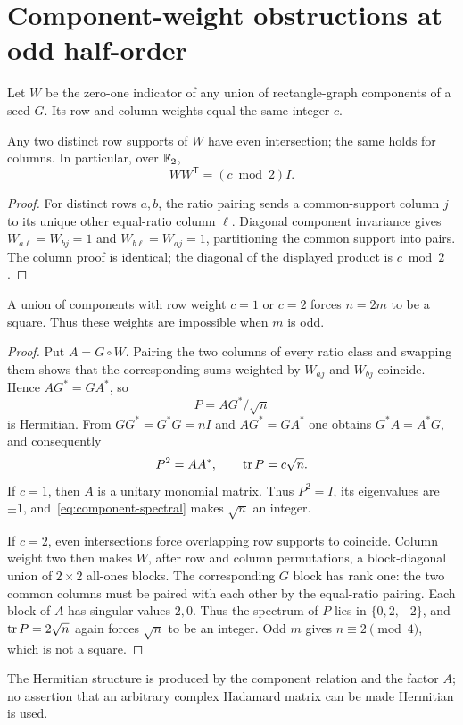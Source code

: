 \section{Component-weight obstructions at odd half-order}\label{sec:obstructions}
Let $W$ be the zero-one indicator of any union of rectangle-graph components of a seed $G$. Its row and column weights equal the same integer $c$.

\begin{lemma}\label{lem:evenintersection}
Any two distinct row supports of $W$ have even intersection; the same holds for columns. In particular, over $\mathbb F_2$,
\[
 WW^{\mathsf T}=(c\bmod2)I.
\]
\end{lemma}
\begin{proof}
For distinct rows $a,b$, the ratio pairing sends a common-support column $j$ to its unique other equal-ratio column $\ell$. Diagonal component invariance gives $W_{a\ell}=W_{bj}=1$ and $W_{b\ell}=W_{aj}=1$, partitioning the common support into pairs. The column proof is identical; the diagonal of the displayed product is $c\bmod2$.
\end{proof}

\begin{proposition}\label{prop:weightsmall}
A union of components with row weight $c=1$ or $c=2$ forces $n=2m$ to be a square. Thus these weights are impossible when $m$ is odd.
\end{proposition}
\begin{proof}
Put $A=G\circ W$. Pairing the two columns of every ratio class and swapping them shows that the corresponding sums weighted by $W_{aj}$ and $W_{bj}$ coincide. Hence $AG^*=GA^*$, so
\[
 P=AG^*/\sqrt n
\]
is Hermitian. From $GG^*=G^*G=nI$ and $AG^*=GA^*$ one obtains $G^*A=A^*G$, and consequently
\begin{equation}\label{eq:component-spectral}
 P^2=AA^*,\qquad\operatorname{tr} P=c\sqrt n.
\end{equation}
If $c=1$, then $A$ is a unitary monomial matrix. Thus $P^2=I$, its eigenvalues are $\pm1$, and~\eqref{eq:component-spectral} makes $\sqrt n$ an integer.

If $c=2$, even intersections force overlapping row supports to coincide. Column weight two then makes $W$, after row and column permutations, a block-diagonal union of $2\times2$ all-ones blocks. The corresponding $G$ block has rank one: the two common columns must be paired with each other by the equal-ratio pairing. Each block of $A$ has singular values $2,0$. Thus the spectrum of $P$ lies in $\{0,2,-2\}$, and $\operatorname{tr} P=2\sqrt n$ again forces $\sqrt n$ to be an integer. Odd $m$ gives $n\equiv2\pmod4$, which is not a square.
\end{proof}
The Hermitian structure is produced by the component relation and the factor $A$; no assertion that an arbitrary complex Hadamard matrix can be made Hermitian is used.

